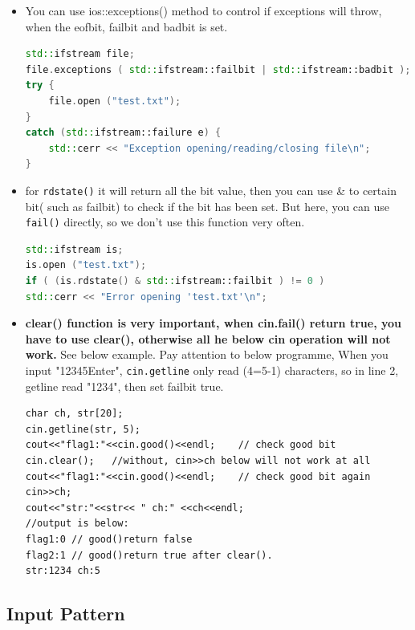 \documentclass[a4paper,11pt,twoside]{book}
\begin{document}
\begin{itemize}
	\item You can use ios::exceptions() method to control if exceptions will throw, when the eofbit, failbit and badbit is set.
\begin{lstlisting}[frame=single, language=c++]
std::ifstream file;
file.exceptions ( std::ifstream::failbit | std::ifstream::badbit );
try {
	file.open ("test.txt");
}
catch (std::ifstream::failure e) {
	std::cerr << "Exception opening/reading/closing file\n";
}

\end{lstlisting}

	
	\item for \texttt{rdstate()} it will return all the bit value, then you can use \& to certain bit( such as failbit) to check if the bit has been set. But here, you can use \texttt{fail()} directly, so we don't use this function very often.
\begin{lstlisting}[frame=single, language=c++]
std::ifstream is;
is.open ("test.txt");
if ( (is.rdstate() & std::ifstream::failbit ) != 0 )
std::cerr << "Error opening 'test.txt'\n";
\end{lstlisting}
	
	
	\item \textbf{clear() function is very important, when cin.fail() return true, you have to use clear(), otherwise all he below cin operation will not work.} See below example. Pay attention to below programme, When you input "12345Enter", \texttt{cin.getline} only read (4=5-1) characters, so in line 2, getline read "1234", then set failbit true.
	
\begin{lstlisting}[]
char ch, str[20];
cin.getline(str, 5);
cout<<"flag1:"<<cin.good()<<endl;    // check good bit
cin.clear();   //without, cin>>ch below will not work at all
cout<<"flag1:"<<cin.good()<<endl;    // check good bit again
cin>>ch;
cout<<"str:"<<str<< " ch:" <<ch<<endl;
//output is below:
flag1:0 // good()return false
flag2:1 // good()return true after clear().
str:1234 ch:5
\end{lstlisting}

\end{itemize}

\subsection{Input Pattern}
\end{document}
